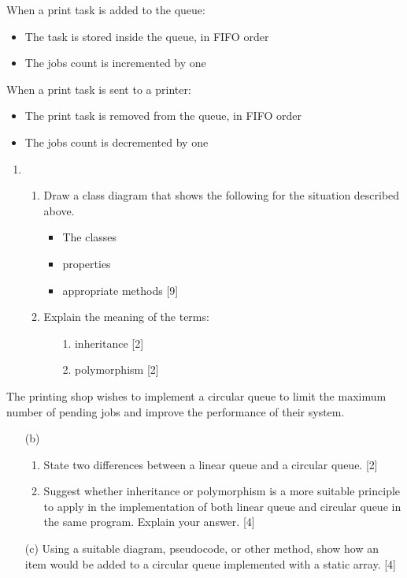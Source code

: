 When a print task is added to the queue: 
\begin{itemize}
\item The task is stored inside the queue, in FIFO order 
\item The jobs count is incremented by one 
\end{itemize}
When a print task is sent to a printer: 
\begin{itemize}
\item The print task is removed from the queue, in FIFO order 
\item The jobs count is decremented by one
\end{itemize}
\begin{enumerate}
\item {}
\begin{enumerate}
\item Draw a class diagram that shows the following for the situation described
above. 
\begin{itemize}
\item The classes 
\item properties 
\item appropriate methods \hfill{}{[}9{]}
\end{itemize}
\item Explain the meaning of the terms: 
\begin{enumerate}
\item[1.]  inheritance \hfill{}{[}2{]}
\item[2.]  polymorphism \hfill{}{[}2{]}
\end{enumerate}
\end{enumerate}
\end{enumerate}
The printing shop wishes to implement a circular queue to limit the
maximum number of pending jobs and improve the performance of their
system. 
\begin{enumerate}
\item[(b)]  {}
\begin{enumerate}
\item State two differences between a linear queue and a circular queue.
\hfill{}{[}2{]}
\item Suggest whether inheritance or polymorphism is a more suitable principle
to apply in the implementation of both linear queue and circular queue
in the same program. Explain your answer. \hfill{}{[}4{]}
\end{enumerate}
\item[(c)]  Using a suitable diagram, pseudocode, or other method, show how
an item would be added to a circular queue implemented with a static
array. \hfill{}{[}4{]}
\end{enumerate}
